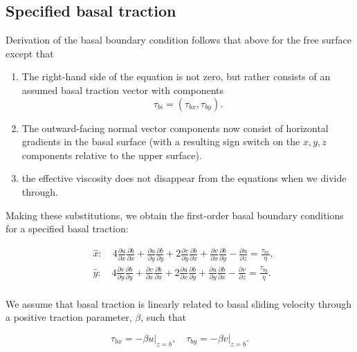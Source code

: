 \subsection{Specified basal traction}
Derivation of the basal boundary condition follows that above for the free surface except that
\begin{enumerate}

\item The right-hand side of the equation is not zero, but rather consists of an assumed basal traction vector with components 
\begin{equation}
\tau_{bi} = \left( \tau _{bx},\tau _{by} \right).
\end{equation}

\item The outward-facing normal vector components now consist of horizontal gradients in the basal surface (with a resulting sign switch on the $x,y,z$ components relative to the upper surface).

\item the effective viscosity does not disappear from the equations when we divide through.
\end{enumerate}

Making these substitutions, we obtain the first-order basal boundary conditions for a specified basal traction:

\begin{equation}
\label{ho.eq.basal_bc}
\begin{split}
  & \hat{x}:\quad 4\frac{\partial u}{\partial x}\frac{\partial b}{\partial x}+\frac{\partial u}{\partial y}\frac{\partial b}{\partial y}+2\frac{\partial v}{\partial y}\frac{\partial b}{\partial x}+\frac{\partial v}{\partial x}\frac{\partial b}{\partial y}-\frac{\partial u}{\partial z}=\frac{\tau _{bx}}{\eta }, \\ 
 & \hat{y}:\quad 4\frac{\partial v}{\partial y}\frac{\partial b}{\partial y}+\frac{\partial v}{\partial x}\frac{\partial b}{\partial x}+2\frac{\partial u}{\partial x}\frac{\partial b}{\partial y}+\frac{\partial u}{\partial y}\frac{\partial b}{\partial x}-\frac{\partial v}{\partial z}=\frac{\tau _{by}}{\eta }. \\
\end{split}
 \end{equation}

\noindent
We assume that basal traction is linearly related to basal sliding velocity through a positive traction parameter, $\beta$, such that

\begin{equation}
\label{ho.eq.basaltraction}
\tau _{bx}=\left. -\beta u \right|_{z=b},\quad \tau _{by}=\left. -\beta v \right|_{z=b}.
\end{equation}

